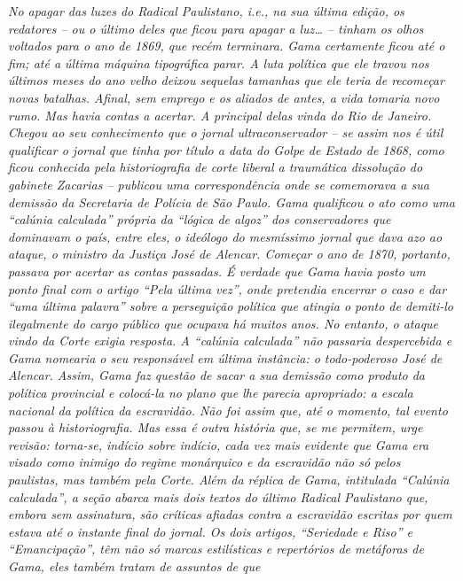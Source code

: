 \begin{argumento}\itshape
No apagar das luzes do \textnormal{Radical Paulistano}, i.e., na sua
última edição, os redatores -- ou o último deles que ficou para apagar a
luz\ldots{} -- tinham os olhos voltados para o ano de 1869, que recém
terminara. Gama certamente ficou até o fim; até a última máquina
tipográfica parar. A luta política que ele travou nos últimos meses do
ano velho deixou sequelas tamanhas que ele teria de recomeçar novas
batalhas. Afinal, sem emprego e os aliados de antes, a vida tomaria novo
rumo. Mas havia contas a acertar. A principal delas vinda do Rio de
Janeiro. Chegou ao seu conhecimento que o jornal ultraconservador -- se
assim nos é útil qualificar o jornal que tinha por título a data do
Golpe de Estado de 1868, como ficou conhecida pela historiografia de
corte liberal a traumática dissolução do gabinete Zacarias -- publicou
uma correspondência onde se comemorava a sua demissão da Secretaria de
Polícia de São Paulo. Gama qualificou o ato como uma ``calúnia calculada''
própria da ``lógica de algoz'' dos conservadores que dominavam o país,
entre eles, o ideólogo do mesmíssimo jornal que dava azo ao ataque, o
ministro da Justiça José de Alencar. Começar o ano de 1870, portanto,
passava por acertar as contas passadas. É verdade que Gama havia posto
um ponto final com o artigo ``Pela última vez'', onde pretendia
encerrar o caso e dar ``uma última palavra'' sobre a perseguição política
que atingia o ponto de demiti-lo ilegalmente do cargo público que
ocupava há muitos anos. No entanto, o ataque vindo da Corte exigia
resposta. A ``calúnia calculada'' não passaria despercebida e Gama
nomearia o seu responsável em última instância: o todo-poderoso José de
Alencar. Assim, Gama faz questão de sacar a sua demissão como produto da
política provincial e colocá-la no plano que lhe parecia apropriado: a
escala nacional da política da escravidão. Não foi assim que, até o
momento, tal evento passou à historiografia. Mas essa é outra história
que, se me permitem, urge revisão: torna-se, indício sobre indício, cada
vez mais evidente que Gama era visado como inimigo do regime monárquico
e da escravidão não só pelos paulistas, mas também pela Corte. Além da
réplica de Gama, intitulada ``Calúnia calculada'', a seção abarca
mais dois textos do último \textnormal{Radical Paulistano} que, embora sem
assinatura, são críticas afiadas contra a escravidão escritas por quem
estava até o instante final do jornal. Os dois artigos, ``Seriedade e
Riso'' e ``Emancipação'', têm não só marcas estilísticas e
repertórios de metáforas de Gama, eles também tratam de assuntos de que

\end{argumento}
